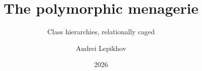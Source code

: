 \documentclass{beamer}
\title[Polymorphic Reference Resolution]{The polymorphic menagerie}
\subtitle[Bottlenecks in N-Way LEFT JOIN Queries]{Class hierarchies, relationally caged}
\author{Andrei Lepikhov}
\institute{pgEdge}
\date{2026}
\begin{document}
%

\begin{frame}
  \titlepage
\end{frame}

%
%
%

%
%

%
%

%
\end{document}
